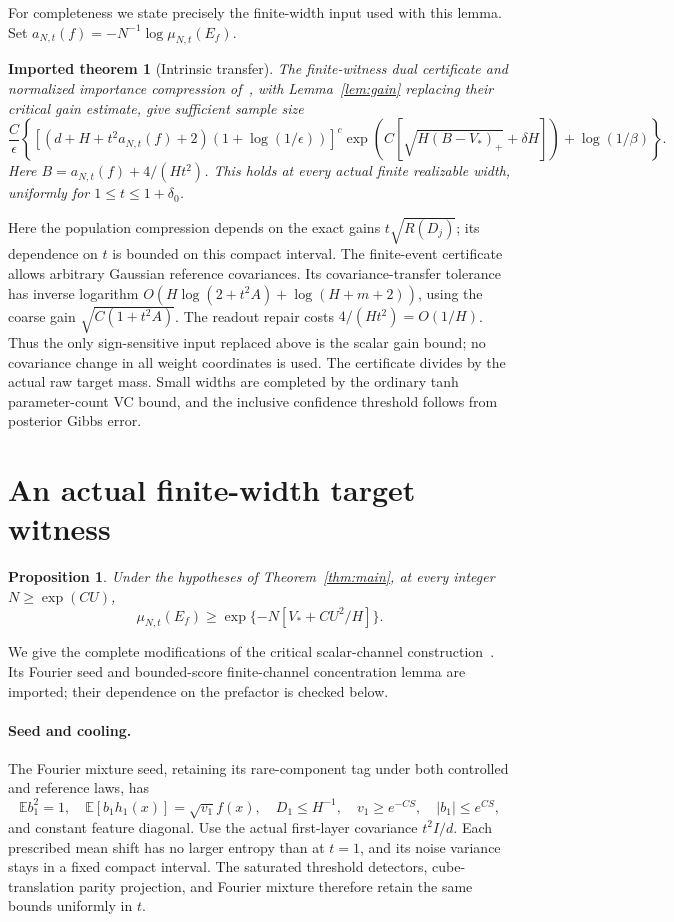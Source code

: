\documentclass[11pt]{article}
\newtheorem{proposition}{Proposition}
\newtheorem{inputlemma}{Imported theorem}
\newcommand{\E}{\mathbb E}
\begin{document}
For completeness we state precisely the finite-width input used with
this lemma. Set $a_{N,t}(f)=-N^{-1}\log\mu_{N,t}(E_f)$.
\begin{inputlemma}[Intrinsic transfer]\label{inp:intrinsic}
The finite-witness dual certificate and normalized importance
compression of~\cite{intrinsic,certificate}, with
Lemma~\ref{lem:gain} replacing their critical gain estimate, give
sufficient sample size
\begin{equation}\label{eq:intrinsic}
 \frac C\epsilon\left\{
 [(d+H+t^2a_{N,t}(f)+2)(1+\log(1/\epsilon))]^c
 \exp\!\left(C\left[\sqrt{H(B-V_*)_+}+\delta H\right]\right)
 +\log(1/\beta)\right\}.
\end{equation}
Here $B=a_{N,t}(f)+4/(Ht^2)$.
This holds at every actual finite realizable width, uniformly for
$1\le t\le1+\delta_0$.
\end{inputlemma}
Here the population compression depends on the exact gains
$t\sqrt{R(D_j)}$; its dependence on $t$ is bounded on this compact
interval. The finite-event certificate allows arbitrary Gaussian
reference covariances. Its covariance-transfer tolerance has inverse
logarithm $O(H\log(2+t^2A)+\log(H+m+2))$, using the coarse gain
$\sqrt{C(1+t^2A)}$. The readout repair costs $4/(Ht^2)=O(1/H)$.
Thus the only sign-sensitive input replaced above is the scalar gain
bound; no covariance change in all weight coordinates is used.
The certificate divides by the actual raw target mass. Small widths
are completed by the ordinary tanh parameter-count VC bound, and the
inclusive confidence threshold follows from posterior Gibbs error.

\section{An actual finite-width target witness}
\begin{proposition}\label{prop:mass}
Under the hypotheses of Theorem~\ref{thm:main}, at every integer
$N\ge\exp(CU)$,
\begin{equation}\label{eq:mass}
 \mu_{N,t}(E_f)\ge\exp\{-N[V_*+CU^2/H]\}.
\end{equation}
\end{proposition}
We give the complete modifications of the critical scalar-channel
construction~\cite{critical,target}. Its Fourier seed and bounded-score
finite-channel concentration lemma are imported; their dependence on
the prefactor is checked below.

\paragraph{Seed and cooling.}
The Fourier mixture seed, retaining its rare-component tag under both
controlled and reference laws, has
\[
 \E b_1^2=1,\quad \E[b_1h_1(x)]=\sqrt{v_1}f(x),\quad
 D_1\le H^{-1},\quad v_1\ge e^{-CS},\quad |b_1|\le e^{CS},
\]
and constant feature diagonal. Use the actual first-layer covariance
$t^2I/d$. Each prescribed mean shift has no larger entropy than at
$t=1$, and its noise variance stays in a fixed compact interval. The
saturated threshold detectors, cube-translation parity projection,
and Fourier mixture therefore retain the same bounds uniformly in $t$.
\end{document}
